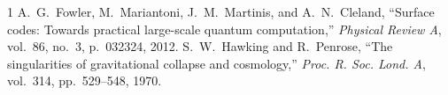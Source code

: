 \documentclass[10pt,journal,compsoc]{IEEEtran}
\begin{document}
\begin{thebibliography}{1}
A.~G.~Fowler, M.~Mariantoni, J.~M.~Martinis, and A.~N.~Cleland, ``Surface codes: Towards practical large-scale quantum computation,'' \emph{Physical Review A}, vol.~86, no.~3, p.~032324, 2012.
S.~W.~Hawking and R.~Penrose, ``The singularities of gravitational collapse and cosmology,'' \emph{Proc. R. Soc. Lond. A}, vol.~314, pp.~529--548, 1970.
\end{thebibliography}
\end{document}
